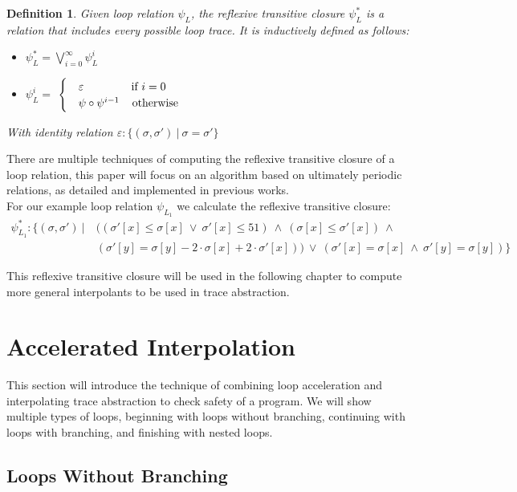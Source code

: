 \documentclass{article}
\newtheorem{mydef}{Definition}
\begin{document}
\begin{mydef}
	Given loop relation $\psi_L$, the reflexive transitive closure $\psi_L^*$ is a relation that includes every possible loop trace. It is inductively defined as follows:
	\begin{itemize}
		\item $\psi^*_L = \bigvee_{i=0}^\infty \psi^i_L$
		\item $\psi^i_L = $
		$\begin{cases}
			& \varepsilon \hspace{1.5cm} \text{if}\ i = 0 \\
			& \psi \circ \psi^{i - 1} \hspace{0.4cm}\text{otherwise}
		\end{cases}$
	\end{itemize}
With identity relation $\varepsilon: \{(\sigma, \sigma')\ |\ \sigma = \sigma'\}$
\end{mydef}
There are multiple techniques of computing the reflexive transitive closure of a loop relation, this paper will focus on an algorithm based on ultimately periodic relations, as detailed and implemented in previous works\cite{JillThesis}. \\

For our example loop relation  	$\psi_{L_1}$ we calculate the reflexive transitive closure:
\begin{align*}
	\psi^*_{L_1}: \{(\sigma, \sigma') \  |\ &((\sigma'[x] \leq \sigma[x]\ \lor\ \sigma'[x] \leq 51)\ \land\ (\sigma[x] \leq \sigma'[x])\ \land\ \\ & (\sigma'[y] = \sigma[y] - 2 \cdot \sigma[x] + 2\cdot \sigma'[x]))\ \lor\ (\sigma'[x] = \sigma[x]\ \land\ \sigma'[y] = \sigma[y]) \}
\end{align*}

This reflexive transitive closure will be used in the following chapter to compute more general interpolants to be used in trace abstraction.

\section{Accelerated Interpolation}
This section will introduce the technique of combining loop acceleration and interpolating trace abstraction to check safety of a program. We will show multiple types of loops, beginning with loops without branching, continuing with loops with branching, and finishing with nested loops. \\

\subsection{Loops Without Branching}
\end{document}
